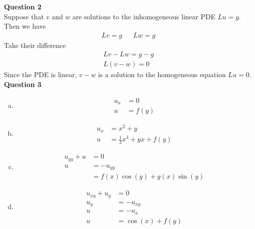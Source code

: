\documentclass[12pt, letterpaper]{article}
\begin{document}
\noindent \textbf{Question 2} \\
Suppose that $v$ and $w$ are solutions to the inhomogeneous linear PDE $Lu = g$. 
Then we have
\begin{align*}
    Lv = g && Lw = g
\end{align*}
Take their difference
\begin{align*}
    Lv - Lw = g - g \\
    L(v-w) = 0
\end{align*}
Since the PDE is linear, $v-w$ is a solution to the homogeneous equation $Lu = 0$. \\

\noindent \textbf{Question 3}
\begin{enumerate}[(a)]
    \item \begin{align*}
        u_x &= 0 \\
        u &= f(y)
    \end{align*}
    \item \begin{align*}
        u_x &= x^2 + y \\
        u &= \frac 13 x^3 + yx + f(y)
    \end{align*}
    \item \begin{align*}
        u_{yy} + u &= 0 \\
        u &= -u_{yy} \\
        &= f(x)\cos(y) + g(x)\sin(y)    
    \end{align*}
    \item \begin{align*}
        u_{xy} + u_y &= 0 \\
        u_y &= - u_{xy} \\
        u &= - u_x \\
        u &= \cos(x) + f(y)
    \end{align*}
\end{enumerate}
\end{document}
